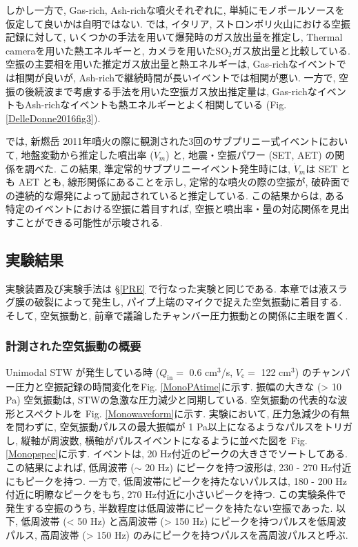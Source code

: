 \documentclass[12pt]{article}
\begin{document}
しかし一方で, Gas-rich, Ash-richな噴火それぞれに, 単純にモノポールソースを仮定して良いかは自明ではない. \cite{DelleDonne2016} では, イタリア, ストロンボリ火山における空振記録に対して, いくつかの手法を用いて爆発時のガス放出量を推定し, Thermal cameraを用いた熱エネルギーと, カメラを用いたSO$_2$ガス放出量と比較している. 
空振の主要相を用いた推定ガス放出量と熱エネルギーは, Gas-richなイベントでは相関が良いが, Ash-richで継続時間が長いイベントでは相関が悪い. 一方で, 空振の後続波まで考慮する手法を用いた空振ガス放出推定量は, Gas-richなイベントもAsh-richなイベントも熱エネルギーとよく相関している (Fig. \ref{DelleDonne2016fig3}). 


\cite{Ichihara2016a}では, 新燃岳 2011年噴火の際に観測された3回のサブプリニー式イベントにおいて, 地盤変動から推定した噴出率 ($\dot{V}_m$) と, 地震・空振パワー (SET, AET) の関係を調べた. この結果, 準定常的サブプリニーイベント発生時には, $\dot{V}_m$は SET とも AET とも, 線形関係にあることを示し, 定常的な噴火の際の空振が, 破砕面での連続的な爆発によって励起されていると推定している. この結果からは, ある特定のイベントにおける空振に着目すれば, 空振と噴出率・量の対応関係を見出すことができる可能性が示唆される.




\clearpage \newpage
\subsection{実験結果}\label{ACOresult}
実験装置及び実験手法は \S \ref{PRE} で行なった実験と同じである. 本章では液スラグ膜の破裂によって発生し, パイプ上端のマイクで捉えた空気振動に着目する. そして, 空気振動と, 前章で議論したチャンバー圧力振動との関係に主眼を置く.  

\subsubsection{計測された空気振動の概要}
Unimodal STW が発生している時 ($Q_\mathrm{in}=$ 0.6 cm$^3$/s, $V_\mathrm{c}=$ 122 cm$^3$) のチャンバー圧力と空振記録の時間変化をFig. \ref{MonoPAtime}に示す. 
振幅の大きな (> 10 Pa) 空気振動は, STWの急激な圧力減少と同期している.
空気振動の代表的な波形とスペクトルを Fig. \ref{Monowaveform}に示す. 実験において, 圧力急減少の有無を問わずに, 空気振動パルスの最大振幅が 1 Pa以上になるようなパルスをトリガし, 縦軸が周波数, 横軸がパルスイベントになるように並べた図を Fig. \ref{Monopspec}に示す. イベントは, 20 Hz付近のピークの大きさでソートしてある.  この結果によれば, 低周波帯 ($\sim$ 20 Hz) にピークを持つ波形は, 230 - 270 Hz付近にもピークを持つ. 一方で, 低周波帯にピークを持たないパルスは, 180 - 200 Hz付近に明瞭なピークをもち, 270 Hz付近に小さいピークを持つ. この実験条件で発生する空振のうち, 半数程度は低周波帯にピークを持たない空振であった. 以下, 低周波帯 (< 50 Hz) と高周波帯 (> 150 Hz) にピークを持つパルスを低周波パルス, 高周波帯 (> 150 Hz) のみにピークを持つパルスを高周波パルスと呼ぶ. 
\end{document}
